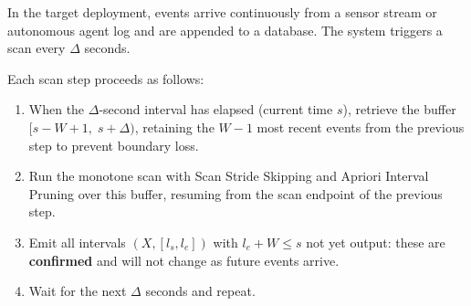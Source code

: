 In the target deployment, events arrive continuously from a
sensor stream or autonomous agent log and are appended to a database.
The system triggers a scan every $\Delta$ seconds.

Each scan step proceeds as follows:

\begin{enumerate}
  \item When the $\Delta$-second interval has elapsed (current time $s$),
        retrieve the buffer $[s - W + 1,\; s + \Delta)$, retaining the
        $W{-}1$ most recent events from the previous step to
        prevent boundary loss.
  \item Run the monotone scan with Scan Stride Skipping and
        Apriori Interval Pruning over this buffer, resuming
        from the scan endpoint of the previous step.
  \item Emit all intervals $(X, [l_s, l_e])$ with $l_e + W \leq s$
        not yet output: these are \textbf{confirmed} and will not
        change as future events arrive.
  \item Wait for the next $\Delta$ seconds and repeat.
\end{enumerate}
